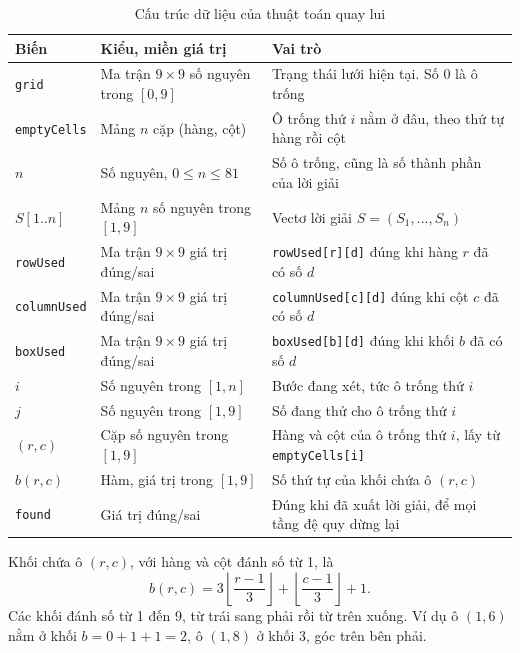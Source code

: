 \begin{table}[H]
  \centering
  \caption{Cấu trúc dữ liệu của thuật toán quay lui}
  \label{tab:data-structures}
  \begin{tabularx}{\linewidth}{@{}>{\raggedright\arraybackslash}p{3.6cm}>{\raggedright\arraybackslash}p{4.2cm}L@{}}
    \toprule
    \textbf{Biến} & \textbf{Kiểu, miền giá trị} & \textbf{Vai trò} \\
    \midrule
    \texttt{grid} & Ma trận \(9 \times 9\) số nguyên trong \([0, 9]\) & Trạng thái lưới hiện tại. Số 0 là ô trống \\
    \texttt{emptyCells} & Mảng \(n\) cặp (hàng, cột) & Ô trống thứ \(i\) nằm ở đâu, theo thứ tự hàng rồi cột \\
    \(n\) & Số nguyên, \(0 \le n \le 81\) & Số ô trống, cũng là số thành phần của lời giải \\
    \(S[1..n]\) & Mảng \(n\) số nguyên trong \([1, 9]\) & Vectơ lời giải \(S = (S_1, \ldots, S_n)\) \\
    \texttt{rowUsed} & Ma trận \(9 \times 9\) giá trị đúng/sai & \texttt{rowUsed[r][d]} đúng khi hàng \(r\) đã có số \(d\) \\
    \texttt{columnUsed} & Ma trận \(9 \times 9\) giá trị đúng/sai & \texttt{columnUsed[c][d]} đúng khi cột \(c\) đã có số \(d\) \\
    \texttt{boxUsed} & Ma trận \(9 \times 9\) giá trị đúng/sai & \texttt{boxUsed[b][d]} đúng khi khối \(b\) đã có số \(d\) \\
    \(i\) & Số nguyên trong \([1, n]\) & Bước đang xét, tức ô trống thứ \(i\) \\
    \(j\) & Số nguyên trong \([1, 9]\) & Số đang thử cho ô trống thứ \(i\) \\
    \((r, c)\) & Cặp số nguyên trong \([1, 9]\) & Hàng và cột của ô trống thứ \(i\), lấy từ \texttt{emptyCells[i]} \\
    \(b(r, c)\) & Hàm, giá trị trong \([1, 9]\) & Số thứ tự của khối chứa ô \((r, c)\) \\
    \texttt{found} & Giá trị đúng/sai & Đúng khi đã xuất lời giải, để mọi tầng đệ quy dừng lại \\
    \bottomrule
  \end{tabularx}
\end{table}

Khối chứa ô \((r, c)\), với hàng và cột đánh số từ 1, là
\[
  b(r, c) = 3 \left\lfloor \frac{r - 1}{3} \right\rfloor + \left\lfloor \frac{c - 1}{3} \right\rfloor + 1 .
\]
Các khối đánh số từ 1 đến 9, từ trái sang phải rồi từ trên xuống. Ví dụ ô \((1, 6)\) nằm ở khối \(b = 0 + 1 + 1 = 2\), ô \((1, 8)\) ở khối 3, góc trên bên phải.

